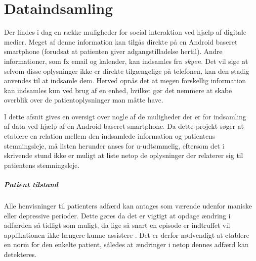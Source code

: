 \chapter{Dataindsamling}\label{datasamling}
Der findes i dag en række muligheder for social interaktion ved hjælp af digitale medier.
Meget af denne information kan tilgås direkte på en Android baseret smartphone (forudsat at patienten giver adgangstilladelse hertil).
Andre informationer, som fx email og kalender, kan indsamles fra \textit{skyen}.
Det vil sige at selvom disse oplysninger ikke er direkte tilgængelige på telefonen, kan den stadig anvendes til at indsamle dem.
Herved opnås det at megen forskellig information kan indsamles kun ved brug af en enhed, hvilket gør det nemmere at skabe overblik over de patientoplysninger man måtte have.

I dette afsnit gives en oversigt over nogle af de muligheder der er for indsamling af data ved hjælp af en Android baseret smartphone.
Da dette projekt søger at etablere en relation mellem den indsamlede information og patientens stemningsleje, må listen herunder anses for u-udtømmelig, eftersom det i skrivende stund ikke er muligt at liste netop de oplysninger der relaterer sig til patientens stemningsleje.

\paragraph{Patient tilstand}
Alle henvisninger til patienters adfærd kan antages som værende udenfor maniske eller depressive perioder.
Dette gøres da det er vigtigt at opdage ændring i adfærden så tidligt som muligt, da lige så snart en episode er indtruffet vil applikationen ikke længere kunne assistere .
Det er derfor nødvendigt at etablere en norm for den enkelte patient, således at ændringer i netop dennes adfærd kan detekteres.








